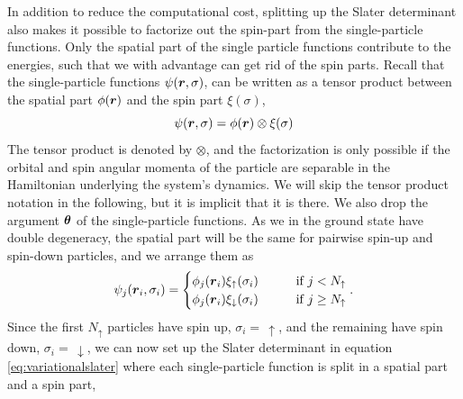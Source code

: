 In addition to reduce the computational cost, splitting up the Slater determinant also makes it possible to factorize out the spin-part from the single-particle functions. Only the spatial part of the single particle functions contribute to the energies, such that we with advantage can get rid of the spin parts. Recall that the single-particle functions $\psi(\boldsymbol{{r}},\sigma)$, can be written as a tensor product between the spatial part $\phi(\boldsymbol{{r}})$ and the spin part $\xi(\sigma)$, 
\begin{equation}
\psi(\boldsymbol{{r}},\sigma)=\phi(\boldsymbol{{r}})\otimes\xi(\sigma) 
\end{equation}
\fi
The tensor product is denoted by $\otimes$, and the factorization is only possible if the orbital and spin angular momenta of the particle are separable in the Hamiltonian underlying the system's dynamics. We will skip the tensor product notation in the following, but it is implicit that it is there. We also drop the argument $\boldsymbol{{\theta}}$ of the single-particle functions. As we in the ground state have double degeneracy, the spatial part will be the same for pairwise spin-up and spin-down particles, and we arrange them as
\begin{equation}
\psi_j(\boldsymbol{{r}}_i,\sigma_i)=
\begin{cases}
\phi_j(\boldsymbol{{r}}_i)\xi_{\uparrow}(\sigma_i)\quad\quad&\text{if } j<N_{\uparrow}\\
\phi_j(\boldsymbol{{r}}_i)\xi_{\downarrow}(\sigma_i)\quad\quad&\text{if } j\geq N_{\uparrow}
\end{cases}.
\end{equation}
Since the first $N_{\uparrow}$ particles have spin up, $\sigma_i=\,\uparrow$, and the remaining have spin down, $\sigma_i=\,\downarrow$, we can now set up the Slater determinant in equation \eqref{eq:variationalslater} where each single-particle function is split in a spatial part and a spin part,

